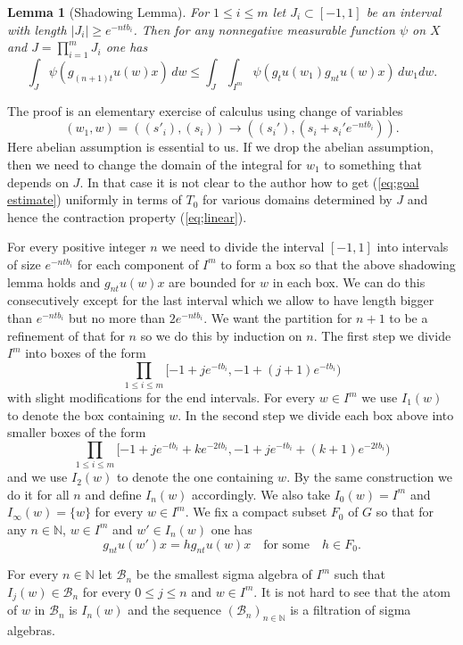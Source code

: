 \documentclass[12pt]{amsart}
\newtheorem{lem}[thm]{Lemma}
\theoremstyle{definition}
\theoremstyle{remark}
\numberwithin{equation}{section}
\begin{document}
\begin{lem}[Shadowing Lemma]\label{lem;shade}
For $1\le i\le m$ let $J_i\subset [-1, 1]$ be an interval with length  $ |J_i|\ge e^{-ntb_i}$.
Then for any nonnegative measurable  function $\psi$ on $X$ and $J=\prod_{i=1}^m J_i$ one has
\begin{equation}
\int_J \psi(g_{(n+1)t}u(w)x)\, dw \le \int_J\int_{I^m} \psi(g_{t}u(w_1)g_{nt}u(w)x) \, dw_1dw.
\end{equation}
\end{lem}
\noindent
 The proof is  an elementary exercise of calculus using  change of  variables 
\[
(w_1, w)=( (  s'_i),( s_i))\to ((s_i'),(s_i+s_i'e^{-ntb_i})).
\]
Here abelian assumption is essential to us. If we drop the abelian  assumption, then we need
to change the domain of the integral for $w_1$ to something that depends on $J$. In that case it is 
not clear to the author how to get (\ref{eq;goal estimate})
uniformly in terms of $T_0$ for various domains determined by $J$
 and hence the contraction property
(\ref{eq;linear}).

For every positive integer $n$
we need to  divide the interval $[-1,1]$ into intervals of size $e^{-ntb_i}$ for each component 
of $I^m$ to form a box so that the above shadowing lemma holds and $g_{nt}u(w)x$
are bounded for $w$ in each box.
We can do this consecutively except for the last interval  which we allow
 to have length bigger than $e^{-ntb_i}$ but 
no more than $2 e^{-ntb_i}$. 
We want  the
 partition for   $n+1$  to be a refinement of that  for  $n$ so 
we do this by induction on $n$. 
The first step we divide $I^m$ into boxes of the form
\[
\prod_{1\le i\le m}[-1 +je^{-tb_i}, -1+(j+1)e^{-tb_i})
\]
with slight modifications for the end  intervals. 
For every $w\in I^m$ we use $I_1(w)$ to denote  the box containing $w$. 
In the second step we  divide each box above into  smaller boxes of the form
\[
\prod_{1\le i\le m}[-1 +je^{-tb_i}+ke^{-2tb_i}, -1+je^{-tb_i}+(k+1)e^{-2tb_i})
\]
and we use
 $I_2(w)$  to denote the one containing $w$. 
By the same construction we do it for all $n$ and define $I_n(w)$ accordingly.
We also take $I_0(w)=I^m$ and $I_\infty(w)=\{w\}$ for every $w\in I^m$.
We fix a compact subset $F_0$ of $G$
 so that for any $n\in \mathbb N$,   $w\in I^m$ and $w'\in I_n(w)$ one has
\begin{equation}\label{eq;compactG}
g_{nt}u(w')x=hg_{nt}u(w)x\quad \mbox{for some}\quad h\in F_0.
\end{equation}

For every $n\in \mathbb N$ let $\mathcal B_n$ be the smallest sigma algebra of $I^m$ such that $I_j(w)\in
\mathcal B_n$ for every  $0\le j\le n$ and  $w\in I^m$. 
It is not hard to see that the atom of $w$ in $\mathcal B_n $ is $I_n(w)$
and the sequence $(\mathcal B_n)_{ n\in \mathbb N}$ is a filtration of sigma algebras. 
\end{document}
